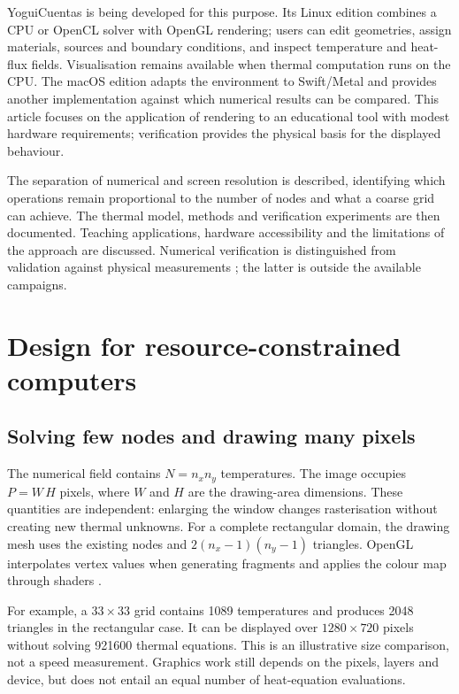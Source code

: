 \documentclass[11pt,a4paper]{article}
\begin{document}
YoguiCuentas \cite{yogui} is being developed for this purpose. Its Linux edition combines a CPU or OpenCL solver with OpenGL rendering; users can edit geometries, assign materials, sources and boundary conditions, and inspect temperature and heat-flux fields. Visualisation remains available when thermal computation runs on the CPU. The macOS edition adapts the environment to Swift/Metal and provides another implementation against which numerical results can be compared. This article focuses on the application of rendering to an educational tool with modest hardware requirements; verification provides the physical basis for the displayed behaviour.

The separation of numerical and screen resolution is described, identifying which operations remain proportional to the number of nodes and what a coarse grid can achieve. The thermal model, methods and verification experiments are then documented. Teaching applications, hardware accessibility and the limitations of the approach are discussed. Numerical verification is distinguished from validation against physical measurements \cite{nasa-verify,nasa-grid}; the latter is outside the available campaigns.

\section{Design for resource-constrained computers}
\subsection{Solving few nodes and drawing many pixels}
The numerical field contains $N=n_xn_y$ temperatures. The image occupies $P=W\,H$ pixels, where $W$ and $H$ are the drawing-area dimensions. These quantities are independent: enlarging the window changes rasterisation without creating new thermal unknowns. For a complete rectangular domain, the drawing mesh uses the existing nodes and $2(n_x-1)(n_y-1)$ triangles. OpenGL interpolates vertex values when generating fragments and applies the colour map through shaders \cite{glsl}.

For example, a $33\times33$ grid contains 1089 temperatures and produces 2048 triangles in the rectangular case. It can be displayed over $1280\times720$ pixels without solving 921600 thermal equations. This is an illustrative size comparison, not a speed measurement. Graphics work still depends on the pixels, layers and device, but does not entail an equal number of heat-equation evaluations.
\end{document}
